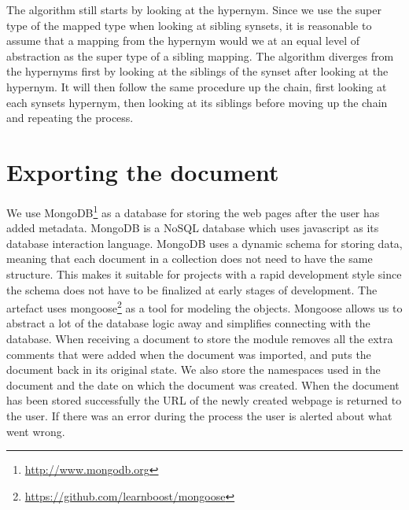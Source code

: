 The algorithm still starts by looking at the hypernym.
Since we use the super type of the mapped type when looking at sibling synsets,
it is reasonable to assume that a mapping from the hypernym would we at an equal level of abstraction as the
super type of a sibling mapping.
The algorithm diverges from the hypernyms first by looking at the siblings of the synset after looking at the hypernym.
It will then follow the same procedure up the chain, first looking at each synsets hypernym,
then looking at its siblings before moving up the chain and repeating the process.



\section{Exporting the document}
We use MongoDB\footnote{\url{http://www.mongodb.org}} as a database for storing the web pages after the user has added metadata.
MongoDB is a NoSQL database which uses javascript as its database interaction language.
MongoDB uses a dynamic schema for storing data,
meaning that each document in a collection does not need to have the same structure.
This makes it suitable for projects with a rapid development style since the schema does not have to be
finalized at early stages of development.
The artefact uses mongoose\footnote{\url{https://github.com/learnboost/mongoose}} as a tool for modeling the objects.
Mongoose allows us to abstract a lot of the database logic away and simplifies connecting with the database.
When receiving a document to store the module removes all the extra comments that were added when the document was
imported, and puts the document back in its original state.
We also store the namespaces used in the document and the date on which the document was created.
When the document has been stored successfully the URL of the newly created webpage is returned to the user.
If there was an error during the process the user is alerted about what went wrong.

